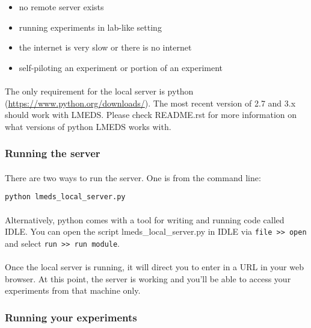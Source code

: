 \begin{itemize}
\item no remote server exists
\item running experiments in lab-like setting
\item the internet is very slow or there is no internet
\item self-piloting an experiment or portion of an experiment
\end{itemize}

\paragraph{}
The only requirement for the local server is python (\url{https://www.python.org/downloads/}).  The most recent version of 2.7 and 3.x should work with LMEDS.  Please check README.rst for more information on what versions of python LMEDS works with.

\subsubsection{Running the server}

\paragraph{}
There are two ways to run the server.  One is from the command line:

\begin{lstlisting}
python lmeds_local_server.py
\end{lstlisting}

\paragraph{}
Alternatively, python comes with a tool for writing and running code called IDLE.  You can open the script lmeds\_local\_server.py in IDLE via \texttt{file >> open} and select \texttt{run >> run module}.

\paragraph{}
Once the local server is running, it will direct you to enter in a URL in your web browser.  At this point, the server is working and you'll be able to access your experiments from that machine only.

\subsubsection{Running your experiments}

